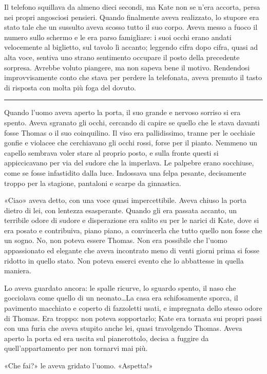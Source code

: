 Il telefono squillava da almeno dieci secondi, ma Kate non se n'era accorta, persa nei propri
angosciosi pensieri. Quando finalmente aveva realizzato, lo stupore era stato tale che un sussulto
aveva scosso tutto il suo corpo. Aveva messo a fuoco il numero sullo schermo e le era parso
famigliare: i suoi occhi erano andati velocemente al biglietto, sul tavolo lì accanto; leggendo
cifra dopo cifra, quasi ad alta voce, sentiva uno strano sentimento occupare il posto della
precedente sorpresa. Avrebbe voluto piangere, ma non sapeva bene il motivo. Rendendosi
improvvisamente conto che stava per perdere la telefonata, aveva premuto il tasto di risposta con
molta più foga del dovuto.

\plainbreak{1}

Quando l'uomo aveva aperto la porta, il suo grande e nervoso sorriso si era spento. Aveva sgranato
gli occhi, cercando di capire se quello che le stava davanti fosse Thomas o il suo coinquilino. Il
viso era pallidissimo, tranne per le occhiaie gonfie e violacee che cerchiavano gli occhi rossi,
forse per il pianto. Nemmeno un capello sembrava voler stare al proprio posto, e sulla fronte questi
si appiccicavano per via del sudore che la imperlava. Le palpebre erano socchiuse, come se fosse
infastidito dalla luce. Indossava una felpa pesante, decisamente troppo per la stagione, pantaloni e
scarpe da ginnastica.

«Ciao» aveva detto, con una voce quasi impercettibile. Aveva chiuso la porta dietro di lei, con
lentezza esasperante. Quando gli era passata accanto, un terribile odore di sudore e disperazione
era salito su per le narici di Kate, dove si era posato e contribuiva, piano piano, a convincerla
che tutto quello non fosse che un sogno. No, non poteva essere Thomas. Non era possibile che l'uomo
appassionato ed elegante che aveva incontrato meno di venti giorni prima si fosse ridotto in quello
stato. Non poteva esserci evento che lo abbattesse in quella maniera.

Lo aveva guardato ancora: le spalle ricurve, lo sguardo spento, il naso che gocciolava come quello
di un neonato\dots La casa era schifosamente sporca, il pavimento macchiato e coperto di fazzoletti
usati, e impregnata dello stesso odore di Thomas. Era troppo: non poteva sopportarlo; Kate era
tornata sui propri passi con una furia che aveva stupito anche lei, quasi travolgendo Thomas. Aveva
aperto la porta ed era uscita sul pianerottolo, decisa a fuggire da quell'appartamento per non
tornarvi mai più.

«Che fai?» le aveva gridato l'uomo. «Aspetta!»

